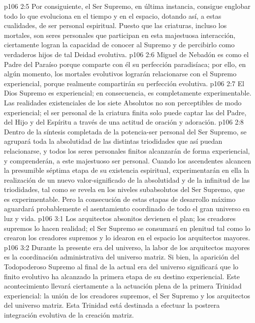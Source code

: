 \vs p106 2:5 Por consiguiente, el Ser Supremo, en última instancia, consigue englobar todo lo que evoluciona en el tiempo y en el espacio, dotando así, a estas cualidades, de ser personal espiritual. Puesto que las criaturas, incluso los mortales, son seres personales que participan en esta majestuosa interacción, ciertamente logran la capacidad de conocer al Supremo y de percibirlo como verdaderos hijos de tal Deidad evolutiva.
\vs p106 2:6 \pc Miguel de Nebadón es como el Padre del Paraíso porque comparte con él su perfección paradisíaca; por ello, en algún momento, los mortales evolutivos lograrán relacionarse con el Supremo experiencial, porque realmente compartirán su perfección evolutiva.
\vs p106 2:7 \pc El Dios Supremo es experiencial; en consecuencia, es completamente experimentable. Las realidades existenciales de los siete Absolutos no son perceptibles de modo experiencial; el ser personal de la criatura finita solo puede captar las  del Padre, del Hijo y del Espíritu a través de una actitud de oración y adoración.
\vs p106 2:8 Dentro de la síntesis completada de la potencia\hyp{}ser personal del Ser Supremo, se agrupará toda la absolutidad de las distintas triodidades que así puedan relacionarse, y todos los seres personales finitos alcanzarán de forma experiencial, y comprenderán, a este majestuoso ser personal. Cuando los ascendentes alcancen la presumible séptima etapa de su existencia espiritual, experimentarán en ella la realización de un nuevo valor\hyp{}significado de la absolutidad y de la infinitud de las triodidades, tal como se revela en los niveles subabsolutos del Ser Supremo, que es experimentable. Pero la consecución de estas etapas de desarrollo máximo aguardará probablemente el asentamiento coordinado de todo el gran universo en luz y vida.
\vs p106 3:1 Los arquitectos absonitos devienen el plan; los creadores supremos lo hacen realidad; el Ser Supremo se consumará en plenitud tal como lo crearon los creadores supremos y lo idearon en el espacio los arquitectos mayores.
\vs p106 3:2 Durante la presente era del universo, la labor de los arquitectos mayores es la coordinación administrativa del universo matriz. Si bien, la aparición del Todopoderoso Supremo al final de la actual era del universo significará que lo finito evolutivo ha alcanzado la primera etapa de su destino experiencial. Este acontecimiento llevará ciertamente a la actuación plena de la primera Trinidad experiencial: la unión de los creadores supremos, el Ser Supremo y los arquitectos del universo matriz. Esta Trinidad está destinada a efectuar la postrera integración evolutiva de la creación matriz.
